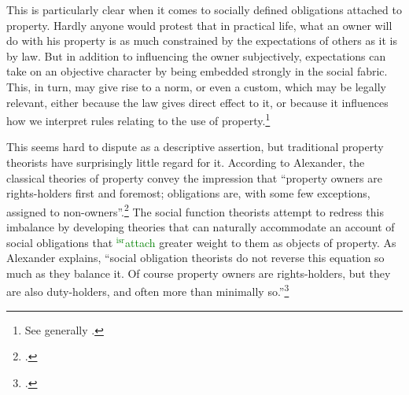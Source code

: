 \documentclass[12pt,a4paper]{book} %
\newcommand{\isr}[1]{\textcolor{green}{$^{\textrm{isr}}${#1}}}
\begin{document}
This is particularly clear when it comes to socially defined obligations attached to property. Hardly anyone would protest that in practical life, what an owner will do with his property is as much constrained by the expectations of others as it is by law. But in addition to influencing the owner subjectively, expectations can take on an objective character by being embedded strongly in the social fabric. This, in turn, may give rise to a norm, or even a custom, which may be legally relevant, either because the law gives direct effect to it, or because it influences how we interpret rules relating to the use of property.\footnote{See generally \cite{penalver09,alexander09}.}

This seems hard to dispute as a descriptive assertion, but traditional property theorists have surprisingly little regard for it. According to Alexander, the classical theories of property convey the impression that ``property owners are rights-holders first and foremost; obligations are, with some few exceptions, assigned to non-owners''.\footcite[1023]{alexander11} The social function theorists attempt to redress this imbalance by developing theories that can naturally accommodate an account of social obligations that \isr{attach} greater weight to them as objects of property. As Alexander explains, ``social obligation theorists do not reverse this equation so much as they balance it. Of course property owners are rights-holders, but they are also duty-holders, and often more than minimally so.''\footcite[1023]{alexander11} 
\end{document}
